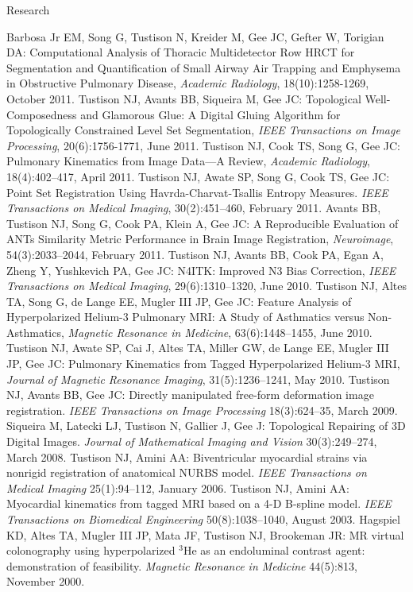\documentclass{resume}
\begin{document}
\begin{category}{Research}
\begin{itemize}
    \citemnobullet Barbosa Jr EM, Song G, Tustison N, Kreider M, Gee JC, Gefter W, Torigian DA:  Computational Analysis of Thoracic Multidetector Row HRCT for Segmentation and Quantification of Small Airway Air Trapping and Emphysema in Obstructive Pulmonary Disease, {\em Academic Radiology}, 18(10):1258-1269, October 2011.
    \citemnobullet Tustison NJ, Avants BB, Siqueira M, Gee JC:  Topological Well-Composedness and Glamorous Glue:  A Digital Gluing Algorithm for Topologically Constrained Level Set Segmentation, {\em IEEE Transactions on Image Processing}, 20(6):1756-1771, June 2011.
    \citemnobullet Tustison NJ, Cook TS, Song G, Gee JC:  Pulmonary Kinematics from Image Data---A Review, {\em Academic Radiology}, 18(4):402--417, April 2011.
    \citemnobullet Tustison NJ, Awate SP, Song G, Cook TS, Gee JC:  Point Set Registration Using Havrda-Charvat-Tsallis Entropy Measures. {\em IEEE Transactions on Medical Imaging}, 30(2):451--460, February 2011.
    \citemnobullet Avants BB, Tustison NJ, Song G, Cook PA, Klein A, Gee JC:  A Reproducible Evaluation of ANTs Similarity Metric Performance in Brain Image Registration, {\em Neuroimage}, 54(3):2033--2044, February 2011.
    \citemnobullet Tustison NJ, Avants BB, Cook PA, Egan A, Zheng Y, Yushkevich PA, Gee JC:  N4ITK:  Improved N3 Bias Correction, {\em IEEE Transactions on Medical Imaging}, 29(6):1310--1320, June 2010.
    \citemnobullet Tustison NJ, Altes TA, Song G, de Lange EE, Mugler III JP, Gee JC:  Feature Analysis of Hyperpolarized Helium-3 Pulmonary MRI:  A Study of Asthmatics versus Non-Asthmatics, {\em Magnetic Resonance in Medicine}, 63(6):1448--1455, June 2010.
    \citemnobullet Tustison NJ, Awate SP, Cai J, Altes TA, Miller GW, de Lange EE, Mugler III JP, Gee JC:  Pulmonary Kinematics from Tagged Hyperpolarized Helium-3 MRI, {\em Journal of Magnetic Resonance Imaging}, 31(5):1236--1241, May 2010.
    \citemnobullet Tustison NJ, Avants BB, Gee JC: Directly manipulated free-form deformation image registration. {\em IEEE Transactions on Image Processing} 18(3):624--35, March 2009.
    \citemnobullet Siqueira M, Latecki LJ, Tustison N, Gallier J, Gee J: Topological Repairing of 3D Digital Images. {\em Journal of Mathematical Imaging and Vision} 30(3):249--274, March 2008.
    \citemnobullet Tustison NJ, Amini AA: Biventricular myocardial strains via nonrigid registration of anatomical NURBS model. {\em IEEE Transactions on Medical Imaging} 25(1):94--112, January 2006.
    \citemnobullet Tustison NJ, Amini AA: Myocardial kinematics from tagged MRI based on a 4-D B-spline model. {\em IEEE Transactions on Biomedical Engineering} 50(8):1038--1040, August 2003.
    \citemnobullet Hagspiel KD, Altes TA, Mugler III JP, Mata JF, Tustison NJ, Brookeman JR: MR virtual colonography using hyperpolarized $^3$He as an endoluminal contrast agent: demonstration of feasibility. {\em Magnetic Resonance in Medicine} 44(5):813, November 2000.
   \end{itemize}


\end{category}
\end{document}
